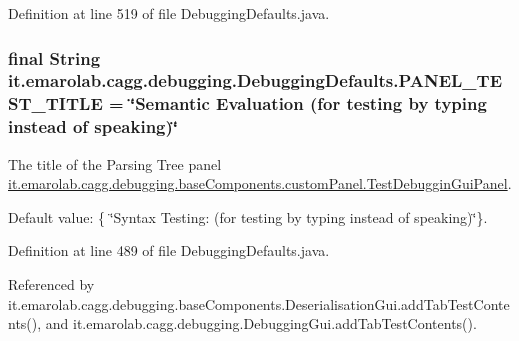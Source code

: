 Definition at line 519 of file Debugging\-Defaults.\-java.

\hypertarget{classit_1_1emarolab_1_1cagg_1_1debugging_1_1DebuggingDefaults_a91891320b8e913a9c5cce11995df1f28}{
\subsubsection[{P\-A\-N\-E\-L\-\_\-\-T\-E\-S\-T\-\_\-\-T\-I\-T\-L\-E}]{\setlength{\rightskip}{0pt plus 5cm}final String it.\-emarolab.\-cagg.\-debugging.\-Debugging\-Defaults.\-P\-A\-N\-E\-L\-\_\-\-T\-E\-S\-T\-\_\-\-T\-I\-T\-L\-E = \char`\"{}Semantic Evaluation (for testing by typing instead of speaking)\char`\"{}\hspace{0.3cm}{\ttfamily [static]}}}\label{classit_1_1emarolab_1_1cagg_1_1debugging_1_1DebuggingDefaults_a91891320b8e913a9c5cce11995df1f28}
The title of the Parsing Tree panel \hyperlink{classit_1_1emarolab_1_1cagg_1_1debugging_1_1baseComponents_1_1customPanel_1_1TestDebugginGuiPanel}{it.\-emarolab.\-cagg.\-debugging.\-base\-Components.\-custom\-Panel.\-Test\-Debuggin\-Gui\-Panel}.\par
 Default value\-: \{ \char`\"{}\-Syntax Testing\-: (for testing by typing instead of speaking)\char`\"{}\}. 

Definition at line 489 of file Debugging\-Defaults.\-java.



Referenced by it.\-emarolab.\-cagg.\-debugging.\-base\-Components.\-Deserialisation\-Gui.\-add\-Tab\-Test\-Contents(), and it.\-emarolab.\-cagg.\-debugging.\-Debugging\-Gui.\-add\-Tab\-Test\-Contents().


